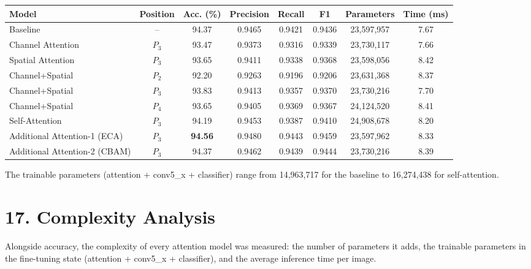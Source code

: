 \documentclass[11pt]{article}
\begin{document}
\begin{center}
\small
\begin{tabular}{|l|c|c|c|c|c|c|c|}
\hline
Model & Position & Acc. (\%) & Precision & Recall & F1 & Parameters & Time (ms)\\
\hline
Baseline & -- & 94.37 & 0.9465 & 0.9421 & 0.9436 & 23{,}597{,}957 & 7.67\\
Channel Attention & $P_3$ & 93.47 & 0.9373 & 0.9316 & 0.9339 & 23{,}730{,}117 & 7.66\\
Spatial Attention & $P_3$ & 93.65 & 0.9411 & 0.9338 & 0.9368 & 23{,}598{,}056 & 8.42\\
Channel+Spatial & $P_2$ & 92.20 & 0.9263 & 0.9196 & 0.9206 & 23{,}631{,}368 & 8.37\\
Channel+Spatial & $P_3$ & 93.83 & 0.9413 & 0.9357 & 0.9370 & 23{,}730{,}216 & 7.70\\
Channel+Spatial & $P_4$ & 93.65 & 0.9405 & 0.9369 & 0.9367 & 24{,}124{,}520 & 8.41\\
Self-Attention & $P_3$ & 94.19 & 0.9453 & 0.9387 & 0.9410 & 24{,}908{,}678 & 8.20\\
Additional Attention-1 (ECA) & $P_3$ & \textbf{94.56} & 0.9480 & 0.9443 & 0.9459 & 23{,}597{,}962 & 8.33\\
Additional Attention-2 (CBAM) & $P_3$ & 94.37 & 0.9462 & 0.9439 & 0.9444 & 23{,}730{,}216 & 8.39\\
\hline
\end{tabular}
\end{center}

The trainable parameters (attention + conv5\_x + classifier) range from
14{,}963{,}717 for the baseline to 16{,}274{,}438 for self-attention.


\section*{17. Complexity Analysis}

Alongside accuracy, the complexity of every attention model was measured:
the number of parameters it adds, the trainable parameters in the
fine-tuning state (attention + conv5\_x + classifier), and the average
inference time per image.
\end{document}
